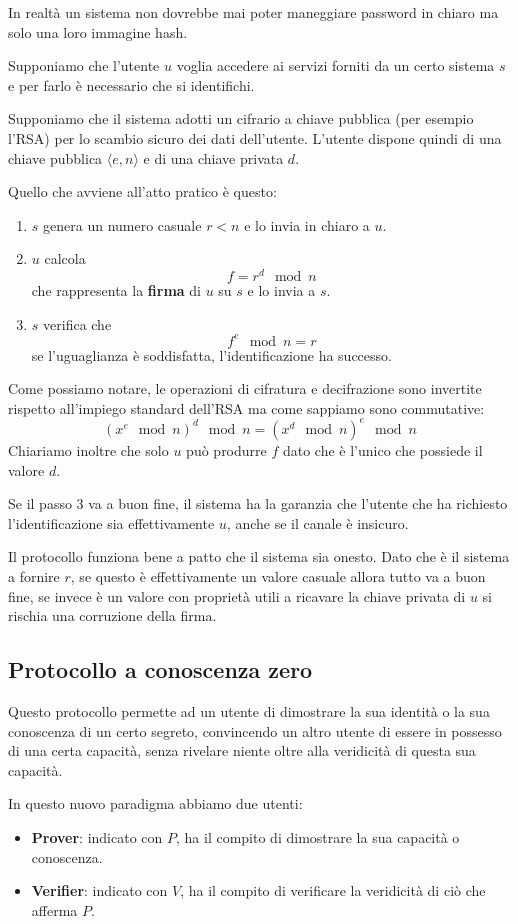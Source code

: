 In realt\`a un sistema non dovrebbe mai poter maneggiare password in chiaro ma solo una loro immagine hash.

Supponiamo che l'utente $u$ voglia accedere ai servizi forniti da un certo sistema $s$ e per farlo \`e necessario
che si identifichi.

Supponiamo che il sistema adotti un cifrario a chiave pubblica (per esempio l'RSA) per lo scambio sicuro dei dati
dell'utente. L'utente dispone quindi di una chiave pubblica $\langle e, n \rangle$ e di una chiave privata $d$.

Quello che avviene all'atto pratico \`e questo:
\begin{enumerate}
	\item $s$ genera un numero casuale $r < n$ e lo invia in chiaro a $u$.
	\item $u$ calcola
	      \[ f = r^d \mod{n} \]
	      che rappresenta la \textbf{firma} di $u$ su $s$ e lo invia a $s$.
	\item $s$ verifica che
	      \[ f^e \mod{n} = r \]
	      se l'uguaglianza \`e soddisfatta, l'identificazione ha successo.
\end{enumerate}
Come possiamo notare, le operazioni di cifratura e decifrazione sono invertite rispetto all'impiego standard dell'RSA
ma come sappiamo sono commutative:
\[ (x^e \mod{n})^d \mod{n} = (x^d \mod{n})^e \mod{n} \]
Chiariamo inoltre che solo $u$ pu\`o produrre $f$ dato che \`e l'unico che possiede il valore $d$.

Se il passo 3 va a buon fine, il sistema ha la garanzia che l'utente che ha richiesto l'identificazione sia
effettivamente $u$, anche se il canale \`e insicuro.

Il protocollo funziona bene a patto che il sistema sia onesto. Dato che \`e il sistema a fornire $r$, se questo \`e
effettivamente un valore casuale allora tutto va a buon fine, se invece \`e un valore con propriet\`a utili a ricavare
la chiave privata di $u$ si rischia una corruzione della firma.

\subsection{Protocollo a conoscenza zero}
Questo protocollo permette ad un utente di dimostrare la sua identit\`a o la sua conoscenza di un certo segreto,
convincendo un altro utente di essere in possesso di una certa capacit\`a, senza rivelare niente oltre alla
veridicit\`a di questa sua capacit\`a.

In questo nuovo paradigma abbiamo due utenti:
\begin{itemize}
	\item \textbf{Prover}: indicato con $P$, ha il compito di dimostrare la sua capacit\`a o conoscenza.
	\item \textbf{Verifier}: indicato con $V$, ha il compito di verificare la veridicit\`a di ci\`o che afferma $P$.
\end{itemize}

